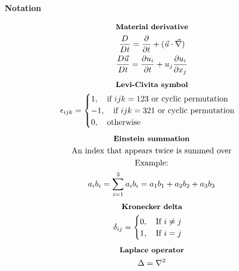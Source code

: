 \documentclass[10pt, a4paper]{article}
\newcommand{\derivative}[2]{\frac{\partial #1}{\partial #2}}
\begin{document}
\begin{center}
    \Large
    \textbf{Notation}
    \vspace{0.5cm}
\end{center}
\begin{gather*}
    \textbf{\small Material derivative} \\
    \frac{D}{Dt} = \derivative{}{t} + (\vec{u}\cdot \vec{\nabla}) \\ %
    \frac{D\vec{u}}{Dt} = \derivative{u_{i}}{t} + u_{j}\derivative{u_{i}}{x_{j}} 
\end{gather*}
\begin{gather*}
    \textbf{\small Levi-Civita symbol} \\
    \epsilon_{ijk} =
    \begin{cases}
        1, \quad \text{if $ijk = 123$ or cyclic permutation}  \\
        -1, \quad \text{if $ijk = 321$ or cyclic permutation} \\
        0, \quad \text{otherwise}
    \end{cases}
\end{gather*}
\begin{gather*}
    \textbf{\small Einstein summation} \\
    \text{An index that appears twice is summed over} \\
    \text{Example:} \\
    a_i b_i = \sum_{i=1}^3 a_i b_i = a_1 b_1 + a_2 b_2 + a_3 b_3
\end{gather*}
\begin{gather*}
    \textbf{\small Kronecker delta} \\
    \delta_{ij} =
    \begin{cases}
        0, \quad \text{If $i \neq j$} \\
        1, \quad \text{If $i = j$}
    \end{cases}
\end{gather*}
\begin{gather*}
    \textbf{\small Laplace operator} \\
    \Delta = \nabla^2
\end{gather*}
\newpage

\end{document}
